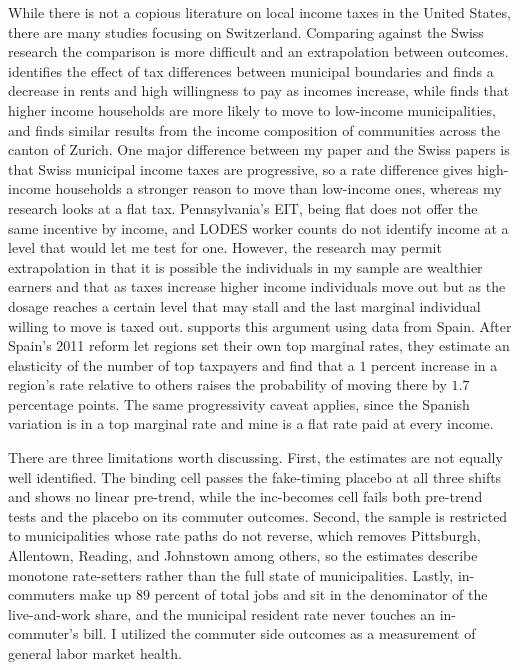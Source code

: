 \documentclass[12pt]{article}
\begin{document}
While there is not a copious literature on local income taxes in the United States, there are many studies focusing on Switzerland. Comparing against the Swiss research the comparison is more difficult and an extrapolation between outcomes. \citet{basten2017} identifies the effect of tax
differences between municipal boundaries and finds a decrease in rents and high willingness to pay as incomes increase, while
\citet{schmidheiny2006} finds that higher income households are more likely to move to low-income municipalities, and
\citet{schalteggerTaxCompetitionIncome2011} finds similar results from the income
composition of communities across the canton of Zurich. One major difference between my paper and the Swiss papers is that Swiss municipal income taxes are progressive, so a
rate difference gives high-income households a stronger reason to move
than low-income ones, whereas my research looks at a flat tax. Pennsylvania's EIT, being flat does not offer the same incentive by income, and LODES worker counts do not identify income at a level that would let me test for one. However, the research may permit extrapolation in that it is possible the individuals in my sample are wealthier earners and that as taxes increase higher income individuals move out but as the dosage reaches a certain level that may stall and the last marginal individual willing to move is taxed out. \citet{agrawalRelocationRichMigration2019} supports this argument using data from Spain. After Spain's 2011 reform let regions set their own top marginal rates, they estimate an elasticity of the number of top taxpayers and find that a $1$ percent increase in a region's rate relative to others raises the probability of moving there by $1.7$ percentage points. The same progressivity caveat applies, since the Spanish variation is in a top marginal rate and mine is a flat rate paid at every income.

There are three limitations worth discussing. First, the estimates are not equally well identified. The
binding cell passes the fake-timing placebo at all three shifts and shows
no linear pre-trend, while the inc-becomes cell fails both
pre-trend tests and the placebo on its commuter outcomes. Second, the sample is
restricted to municipalities whose rate paths do not reverse, which
removes Pittsburgh, Allentown, Reading, and Johnstown among others, so the
estimates describe monotone rate-setters rather than the full state of municipalities.
Lastly, in-commuters make up
$89$ percent of total jobs and sit in the denominator of the live-and-work
share, and the municipal resident rate never touches an in-commuter's
bill. I utilized the commuter side outcomes as a measurement of general labor market health.
\end{document}
